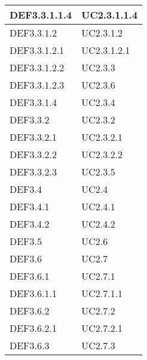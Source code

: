 \documentclass{scalatekids-article}
\begin{document}
\begin{longtable}[H]{|p{5.5cm}|p{5.5cm}|}
  \hline
  DEF3.3.1.1.4 & \multiLineCell[t]{UC2.3.1.1.4\\}\\
  \hline
  DEF3.3.1.2 & \multiLineCell[t]{UC2.3.1.2\\}\\
  \hline
  DEF3.3.1.2.1 & \multiLineCell[t]{UC2.3.1.2.1\\}\\
  \hline
  DEF3.3.1.2.2 & \multiLineCell[t]{UC2.3.3\\}\\
  \hline
  DEF3.3.1.2.3 & \multiLineCell[t]{UC2.3.6\\}\\
  \hline
  DEF3.3.1.4 & \multiLineCell[t]{UC2.3.4\\}\\
  \hline
  DEF3.3.2 & \multiLineCell[t]{UC2.3.2\\}\\
  \hline
  DEF3.3.2.1 & \multiLineCell[t]{UC2.3.2.1\\}\\
  \hline
  DEF3.3.2.2 & \multiLineCell[t]{UC2.3.2.2\\}\\
  \hline
  DEF3.3.2.3 & \multiLineCell[t]{UC2.3.5\\}\\
  \hline
  DEF3.4 & \multiLineCell[t]{UC2.4\\}\\
  \hline
  DEF3.4.1 & \multiLineCell[t]{UC2.4.1\\}\\
  \hline
  DEF3.4.2 & \multiLineCell[t]{UC2.4.2\\}\\
  \hline
  DEF3.5 & \multiLineCell[t]{UC2.6\\}\\
  \hline
  DEF3.6 & \multiLineCell[t]{UC2.7\\}\\
  \hline
  DEF3.6.1 & \multiLineCell[t]{UC2.7.1\\}\\
  \hline
  DEF3.6.1.1 & \multiLineCell[t]{UC2.7.1.1\\}\\
  \hline
  DEF3.6.2 & \multiLineCell[t]{UC2.7.2\\}\\
  \hline
  DEF3.6.2.1 & \multiLineCell[t]{UC2.7.2.1\\}\\
  \hline
  DEF3.6.3 & \multiLineCell[t]{UC2.7.3\\}\\

\end{longtable}
\end{document}
